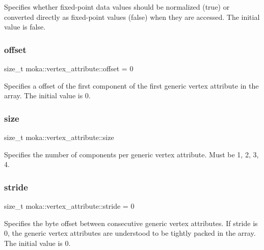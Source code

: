 Specifies whether fixed-\/point data values should be normalized (true) or converted directly as fixed-\/point values (false) when they are accessed. The initial value is false. \mbox{\label{structmoka_1_1vertex__attribute_a373fa56e1d1739964eb12c809a80f358}} 
\subsubsection{\texorpdfstring{offset}{offset}}
{\footnotesize\ttfamily size\+\_\+t moka\+::vertex\+\_\+attribute\+::offset = 0}

Specifies a offset of the first component of the first generic vertex attribute in the array. The initial value is 0. \mbox{\label{structmoka_1_1vertex__attribute_a12e35fefbda322f7630d6366620ec6e5}} 
\subsubsection{\texorpdfstring{size}{size}}
{\footnotesize\ttfamily size\+\_\+t moka\+::vertex\+\_\+attribute\+::size}

Specifies the number of components per generic vertex attribute. Must be 1, 2, 3, 4. \mbox{\label{structmoka_1_1vertex__attribute_ac14a60d2a9728b757d1b0f0bd09cbaa8}} 
\subsubsection{\texorpdfstring{stride}{stride}}
{\footnotesize\ttfamily size\+\_\+t moka\+::vertex\+\_\+attribute\+::stride = 0}

Specifies the byte offset between consecutive generic vertex attributes. If stride is 0, the generic vertex attributes are understood to be tightly packed in the array. The initial value is 0. \mbox{\label{structmoka_1_1vertex__attribute_aa8607ca1afa2836266900168844b6034}} 
